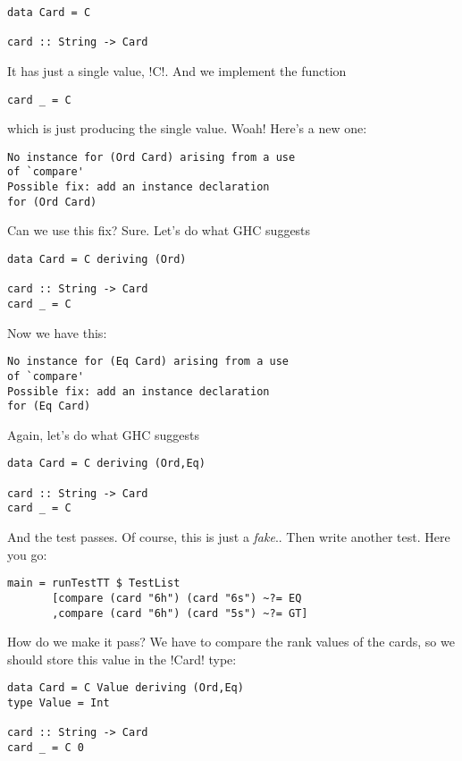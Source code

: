 \begin{lstlisting}[frame=single]
data Card = C 

card :: String -> Card
\end{lstlisting}
It has just a single value, \il!C!. And we implement the function
\begin{lstlisting}[frame=single]
card _ = C
\end{lstlisting}
which is just producing the single value.
\lhN \error Woah! Here's a new one:
\begin{small}
\begin{verbatim}
No instance for (Ord Card) arising from a use 
of `compare' 
Possible fix: add an instance declaration 
for (Ord Card)
\end{verbatim}
\end{small}
Can we use this fix?
\lhA \error Sure. Let's do what GHC suggests
\begin{lstlisting}[frame=single]
data Card = C deriving (Ord)

card :: String -> Card
card _ = C
\end{lstlisting}
\lhN \error Now we have this:
\begin{small}
\begin{verbatim}
No instance for (Eq Card) arising from a use 
of `compare' 
Possible fix: add an instance declaration
for (Eq Card)
\end{verbatim}
\end{small}
\hspace*{\fill} 
\lhA \error Again, let's do what GHC suggests 
\begin{lstlisting}[frame=single]
data Card = C deriving (Ord,Eq)

card :: String -> Card
card _ = C
\end{lstlisting}
\success And the test passes.
\lhN Of course, this is just a \emph{fake}..
\lhA Then write another test.
\lhN Here you go:
\begin{lstlisting}[frame=single]
main = runTestTT $ TestList 
       [compare (card "6h") (card "6s") ~?= EQ
       ,compare (card "6h") (card "5s") ~?= GT]
\end{lstlisting} %
How do we make it pass?
\lhA \error We have to compare the rank values of the cards, so we should store this value in the \il!Card! type:
\begin{lstlisting}[frame=single]
data Card = C Value deriving (Ord,Eq)
type Value = Int

card :: String -> Card
card _ = C 0
\end{lstlisting}
